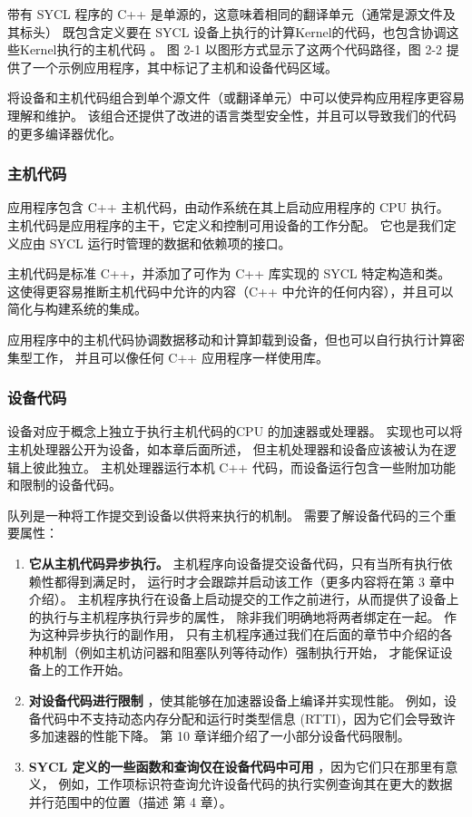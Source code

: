 带有 SYCL 程序的 C++ 是单源的，这意味着相同的翻译单元（通常是源文件及其标头）
既包含定义要在 SYCL 设备上执行的计算Kernel的代码，也包含协调这些Kernel执行的主机代码 。 
图 2-1 以图形方式显示了这两个代码路径，图 2-2 提供了一个示例应用程序，其中标记了主机和设备代码区域。

将设备和主机代码组合到单个源文件（或翻译单元）中可以使异构应用程序更容易理解和维护。 
该组合还提供了改进的语言类型安全性，并且可以导致我们的代码的更多编译器优化。

\subsubsection{主机代码}
应用程序包含 C++ 主机代码，由动作系统在其上启动应用程序的 CPU 执行。 
主机代码是应用程序的主干，它定义和控制可用设备的工作分配。 它也是我们定义应由 SYCL 运行时管理的数据和依赖项的接口。

主机代码是标准 C++，并添加了可作为 C++ 库实现的 SYCL 特定构造和类。 
这使得更容易推断主机代码中允许的内容（C++ 中允许的任何内容），并且可以简化与构建系统的集成。

应用程序中的主机代码协调数据移动和计算卸载到设备，但也可以自行执行计算密集型工作，
并且可以像任何 C++ 应用程序一样使用库。

\subsubsection{设备代码}
设备对应于概念上独立于执行主机代码的CPU 的加速器或处理器。 实现也可以将主机处理器公开为设备，如本章后面所述，
但主机处理器和设备应该被认为在逻辑上彼此独立。 
主机处理器运行本机 C++ 代码，而设备运行包含一些附加功能和限制的设备代码。

队列是一种将工作提交到设备以供将来执行的机制。 需要了解设备代码的三个重要属性：

\begin{enumerate}
	\item \textbf{它从主机代码异步执行。} 主机程序向设备提交设备代码，只有当所有执行依赖性都得到满足时，
	运行时才会跟踪并启动该工作（更多内容将在第 3 章中介绍）。 
	主机程序执行在设备上启动提交的工作之前进行，从而提供了设备上的执行与主机程序执行异步的属性，
	除非我们明确地将两者绑定在一起。 作为这种异步执行的副作用，
	只有主机程序通过我们在后面的章节中介绍的各种机制（例如主机访问器和阻塞队列等待动作）强制执行开始，
	才能保证设备上的工作开始。

	\item \textbf{对设备代码进行限制} ，使其能够在加速器设备上编译并实现性能。 
	例如，设备代码中不支持动态内存分配和运行时类型信息 (RTTI)，因为它们会导致许多加速器的性能下降。 
	第 10 章详细介绍了一小部分设备代码限制。

	\item \textbf{SYCL 定义的一些函数和查询仅在设备代码中可用} ，因为它们只在那里有意义，
	例如，工作项标识符查询允许设备代码的执行实例查询其在更大的数据并行范围中的位置（描述 第 4 章）。
\end{enumerate}

